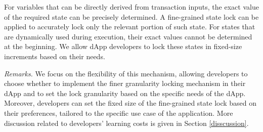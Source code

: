 For variables that can be directly derived from transaction inputs, the exact value of the required state can be precisely determined.
A fine-grained state lock can be applied to accurately lock only the relevant portion of such state.
For states that are dynamically used during execution, their exact values cannot be determined at the beginning. 
We allow dApp developers to lock these states in fixed-size increments based on their needs.

\vspace{3pt}
\noindent
\emph{Remarks.}
We focus on the flexibility of this mechanism, allowing developers to choose whether to implement the finer granularity locking mechanism in their dApp and to set the lock granularity based on the specific needs of the dApp. 
Moreover, developers can set the fixed size of the fine-grained state lock based on their preferences, tailored to the specific use case of the application.
More discussion related to developers' learning costs is given in Section \ref{disscussion}.